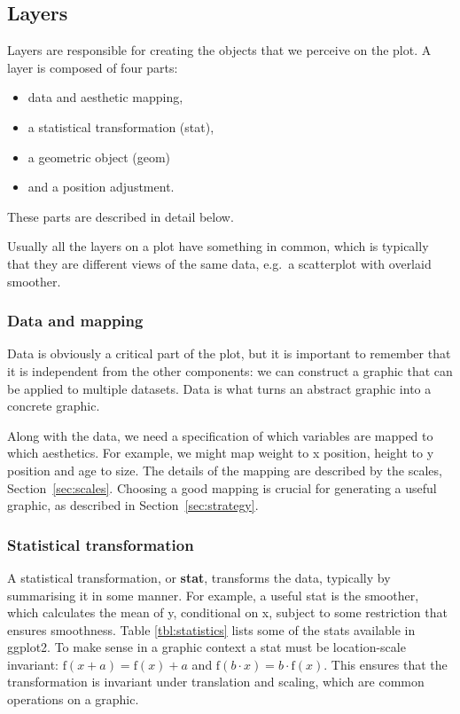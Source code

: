\subsection{Layers}

Layers are responsible for creating the objects that we perceive on the plot.  A layer is composed of four parts:  

\begin{itemize}
	\item data and aesthetic mapping,
	\item a statistical transformation (stat), 
	\item a geometric object (geom)
	\item and a position adjustment.
\end{itemize}

\noindent These parts are described in detail below.

Usually all the layers on a plot have something in common, which is typically that they are different views of the same data, e.g.\ a scatterplot with overlaid smoother.  


\subsubsection{Data and mapping}\label{sub:data_and_mapping} 

Data is obviously a critical part of the plot, but it is important to remember that it is independent from the other components: we can construct a graphic that can be applied to multiple datasets. Data is what turns an abstract graphic into a concrete graphic.

Along with the data, we need a specification of which variables are mapped to which aesthetics.  For example, we might map weight to x position, height to y position and age to size.  The details of the mapping are described by the scales, Section~\ref{sec:scales}.  Choosing a good mapping is crucial for generating a useful graphic, as described in Section~\ref{sec:strategy}.

\subsubsection{Statistical transformation}\label{sub:stats} 

A statistical transformation, or {\bf stat}, transforms the data, typically by summarising it in some manner.  For example, a useful stat is the smoother, which calculates the mean of y, conditional on x, subject to some restriction that ensures smoothness. Table \ref{tbl:statistics} lists some of the stats available in ggplot2.  To make sense in a graphic context a stat must be location-scale invariant: $\mbox{f}(x + a) = \mbox{f}(x) + a$ and $\mbox{f}(b \cdot x) = b \cdot \mbox{f}(x)$.  This ensures that the transformation is invariant under translation and scaling, which are common operations on a graphic.

